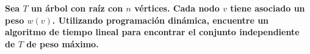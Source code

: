 \textbf{Sea $T$ un árbol con raíz con $n$ vértices. Cada nodo $v$ tiene asociado un peso $w(v)$. Utilizando programación dinámica, encuentre un algoritmo de tiempo lineal para encontrar el conjunto independiente de $T$ de peso máximo.}\vspace{.2cm}

\textcolor{bibi}{}
\begin{quote}
\end{quote}